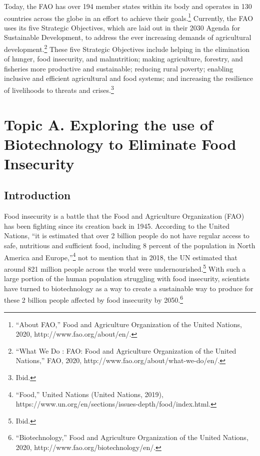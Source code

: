 \documentclass[10pt, letterpaper]{article}
\begin{document}
Today, the FAO has over 194 member states within its body and operates
in 130 countries across the globe in an effort to achieve their
goals.\footnote{``About FAO,'' Food and Agriculture Organization of the
  United Nations, 2020, http://www.fao.org/about/en/.} Currently, the
FAO uses its five Strategic Objectives, which are laid out in their 2030
Agenda for Sustainable Development, to address the ever increasing
demands of agricultural development.\footnote{``What We Do : FAO: Food
  and Agriculture Organization of the United Nations,'' FAO, 2020,
  http://www.fao.org/about/what-we-do/en/.} These five Strategic
Objectives include helping in the elimination of hunger, food
insecurity, and malnutrition; making agriculture, forestry, and
fisheries more productive and sustainable; reducing rural poverty;
enabling inclusive and efficient agricultural and food systems; and
increasing the resilience of livelihoods to threats and
crises.\footnote{Ibid.} \\

\newpage
\section{Topic A. Exploring the use of Biotechnology to Eliminate Food
Insecurity}

\subsection{Introduction}

Food insecurity is a battle that the Food and Agriculture Organization
(FAO) has been fighting since its creation back in 1945. According to
the United Nations, ``it is estimated that over 2 billion people do not
have regular access to safe, nutritious and sufficient food, including 8
percent of the population in North America and Europe,''\footnote{``Food,''
  United Nations (United Nations, 2019),
  https://www.un.org/en/sections/issues-depth/food/index.html.} not to
mention that in 2018, the UN estimated that around 821 million people
across the world were undernourished.\footnote{Ibid.} With such a large
portion of the human population struggling with food insecurity,
scientists have turned to biotechnology as a way to create a sustainable
way to produce for these 2 billion people affected by food insecurity by
2050.\footnote{``Biotechnology,'' Food and Agriculture Organization of
  the United Nations, 2020, http://www.fao.org/biotechnology/en/.} \\
\end{document}
